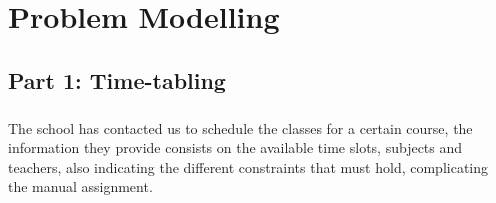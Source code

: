 \chapter{Problem Modelling}
\label{chapter: problem modelling}


\section{Part 1: Time-tabling}

\paragraph{}
The school has contacted us to schedule the classes for a certain course, the information they provide consists on the available time slots, subjects and teachers, also indicating the different constraints that must hold, complicating the manual assignment.

